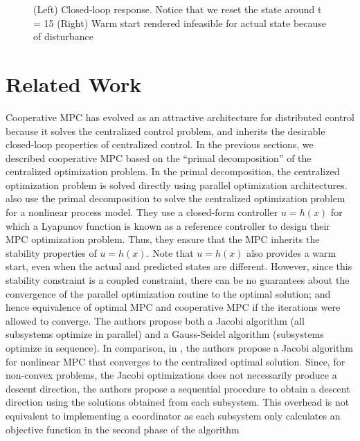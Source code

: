 \begin{figure}
\centering
\scriptsize
\resizebox{1\textwidth}{!}{}
\caption{(Left) Closed-loop response. Notice that we reset the state
  around t = 15 (Right) Warm start rendered
  infeasible for actual state because of disturbance}
\label{fig:mpc:CL2}
\end{figure}





\section{Related Work}
\label{sec:mpc:related}
Cooperative MPC has evolved as an  attractive architecture for
distributed control because it solves the centralized control
problem, and inherits the desirable closed-loop properties of
centralized control. 
In the previous sections, we described
cooperative MPC based on the ``primal decomposition'' of the
centralized optimization
problem. In the primal decomposition, the centralized optimization
problem is solved directly using parallel optimization
architectures. \citet{liu:chen:pena:christofides:2010} also use the
primal decomposition to solve the centralized optimization problem for a
nonlinear process model. They use a closed-form controller $u=h(x)$
for which a Lyapunov function is known as a reference controller to
design their MPC optimization problem. Thus, they ensure that the MPC
inherits the stability properties of $u=h(x)$. Note that $u=h(x)$ also
provides a warm start, even when the actual and predicted states are
different. However, since this stability constraint is a coupled
constraint, there can be no guarantees about the convergence of the
parallel optimization routine to the optimal solution; and hence equivalence of optimal MPC
and cooperative MPC if the iterations were allowed to converge. The authors propose both a Jacobi
algorithm (all subsystems optimize in parallel) and a Gauss-Seidel
algorithm (subsystems optimize in sequence). In comparison, in
\citet{stewart:wright:rawlings:2011}, the authors propose a Jacobi
algorithm for nonlinear MPC that converges to the centralized optimal
solution. Since, for non-convex problems, the Jacobi optimizations
does not necessarily produce a descent direction, the authors propose
a sequential procedure to obtain a descent direction using the
solutions obtained from each subsystem. This overhead is not
equivalent to implementing a coordinator as each subsystem only
calculates an objective function in the second phase of the algorithm
